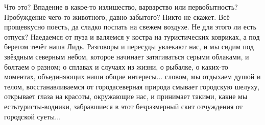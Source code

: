 Что это? Впадение в какое-то излишество, варварство или первобытность? Пробуждение чего-то животного, давно забытого? Никто не скажет. Всё проще\mdash вкусно поесть, да сладко поспать на свежем воздухе. Не для этого ли есть отпуск? Наедаемся от пуза и валяемся у костра на туристических ковриках, а под берегом течёт наша Лидь. Разговоры и пересуды увлекают нас, и мы сидим под звёздным северным небом, которое начинает затягиваться серыми облаками, и болтаем о разном; о сплавах и случаях из жизни, о рыбалке, о каких-то моментах, объединяющих наши общие интересы$\ldots$ словом, мы отдыхаем душой и телом, восстанавливаемся от города\mdash северная природа смывает городскую шелуху, открывает глаза на красоты, окружающие нас, и принимает такими, какие мы есть\mdash туристы-водники, забравшиеся в этот безразмерный скит отчуждения от городской суеты$\ldots$ 

\begin{center}
\end{center}
